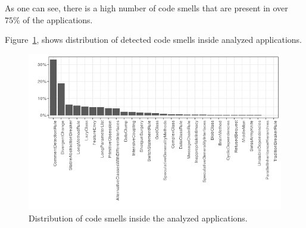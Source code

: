 As one can see, there is a high number of code smells that are present in over $75\%$ of the applications.

Figure~\ref{fig:distribution}, shows distribution of detected code smells inside analyzed applications.

\begin{figure}
    \includegraphics[scale=0.8]{figures/distribution_2.png}
    \caption{Distribution of code smells inside the analyzed applications.}
    \label{fig:distribution}
\end{figure}

\FloatBarrier


